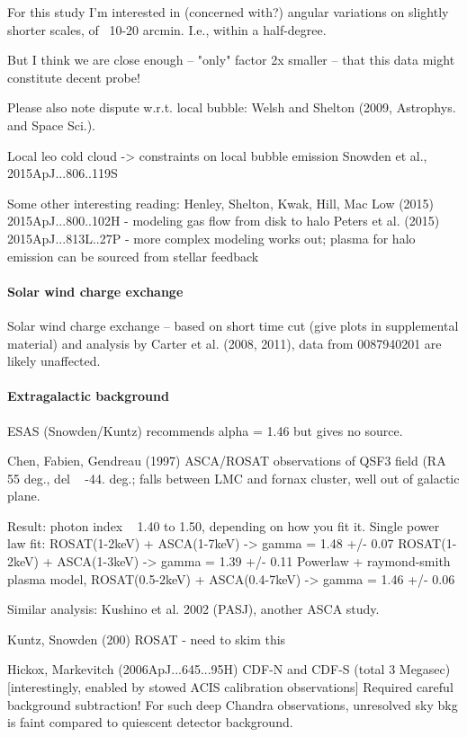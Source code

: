 \documentclass[preprint2,tighten,trackchanges]{aastex6}
\begin{document}
    For this study I'm interested in (concerned with?)
    angular variations on slightly shorter scales, of ~10-20 arcmin.  I.e.,
    within a half-degree.

    But I think we are close enough -- "only" factor 2x smaller -- that this
    data might constitute decent probe!



Please also note dispute w.r.t. local bubble: Welsh and Shelton (2009,
Astrophys. and Space Sci.).

Local leo cold cloud -> constraints on local bubble emission
Snowden et al., 2015ApJ...806..119S

Some other interesting reading:
Henley, Shelton, Kwak, Hill, Mac Low (2015) 2015ApJ...800..102H
- modeling gas flow from disk to halo
Peters et al. (2015) 2015ApJ...813L..27P
- more complex modeling works out; plasma for halo emission can be sourced from
  stellar feedback

\paragraph{Solar wind charge exchange}

Solar wind charge exchange -- based on short time cut (give plots in
supplemental material) and analysis by Carter et al. (2008, 2011),
data from 0087940201 are likely unaffected.

\paragraph{Extragalactic background}

ESAS (Snowden/Kuntz) recommends alpha = 1.46 but gives no source.

Chen, Fabien, Gendreau (1997)
  ASCA/ROSAT observations of QSF3 field (RA ~ 55 deg., del ~ -44. deg.; falls
  between LMC and fornax cluster, well out of galactic plane.

  Result: photon index ~ 1.40 to 1.50, depending on how you fit it.
  Single power law fit:
    ROSAT(1-2keV) + ASCA(1-7keV) -> gamma = 1.48 +/- 0.07
    ROSAT(1-2keV) + ASCA(1-3keV) -> gamma = 1.39 +/- 0.11
  Powerlaw + raymond-smith plasma model,
    ROSAT(0.5-2keV) + ASCA(0.4-7keV) -> gamma = 1.46 +/- 0.06

Similar analysis:
Kushino et al. 2002 (PASJ), another ASCA study.

Kuntz, Snowden (200)
    ROSAT - need to skim this

Hickox, Markevitch (2006ApJ...645...95H)
    CDF-N and CDF-S (total 3 Megasec)
    [interestingly, enabled by stowed ACIS calibration observations]
    Required careful background subtraction!
      For such deep Chandra observations, unresolved sky bkg is faint compared
      to quiescent detector background.
\end{document}

